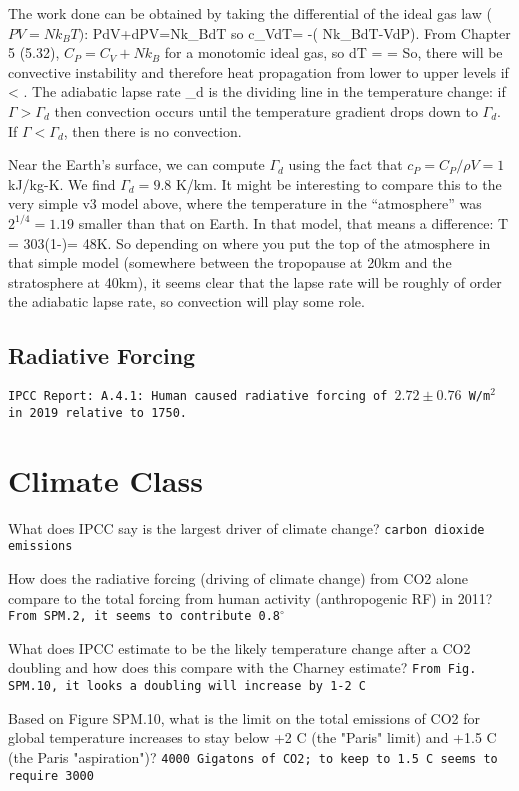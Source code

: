 \documentclass[11pt]{book}
\begin{document}
The work done can be obtained by taking the differential of the ideal gas law ($PV=Nk_BT)$:
\be
PdV+dPV=Nk_BdT\ee
so
\be
c_VdT= -\left( Nk_BdT-VdP\right).
\ee
From Chapter 5 (5.32), $C_P=C_V+Nk_B$ for a monotomic ideal gas, so
\be
dT =  = 
\ee
So, there will be convective instability and therefore heat propagation from lower to upper levels if
\be
{} < \Gamma.
\ee
The adiabatic lapse rate \be
\Gamma_d \equiv {}
\ee
is the dividing line in the temperature change: if $\Gamma>\Gamma_d$ then convection occurs until the temperature gradient drops down to $\Gamma_d$. If $\Gamma< \Gamma_d$, then there is no convection.

Near the Earth's surface, we can compute $\Gamma_d$ using the fact that $c_P=C_P/\rho V=1$ kJ/kg-K. We find $\Gamma_d=9.8$ K/km. It might be interesting to compare this to the very simple v3 model above, where the temperature in the ``atmosphere'' was $2^{1/4}=1.19$ smaller than that on Earth. In that model, that means a difference: 
\be
\Delta T = 303\left(1-\right)= 48K.\ee
So depending on where you put the top of the atmosphere in that simple model (somewhere between the tropopause at 20km and the stratosphere at 40km), it seems clear that the lapse rate will be roughly of order the adiabatic lapse rate, so convection will play some role.

\newcommand\ipcc[1]{{\tt IPCC Report: #1}}

\section{Radiative Forcing}

\ipcc{A.4.1: Human caused radiative forcing of $2.72\pm 0.76$ W/m$^2$ in 2019 relative to 1750.}

\appendix
\newcommand\ans[1]{{\tt #1}}
\chapter{Climate Class}

\bee
\item What does IPCC say is the largest driver of climate change?
\ans{carbon dioxide emissions}
\item How does the radiative forcing (driving of climate change) from CO2 alone compare to the total forcing from human activity (anthropogenic RF) in 2011?
\ans{From SPM.2, it seems to contribute 0.8$^\circ$}
\item What does IPCC estimate to be the likely temperature change after a CO2 doubling and how does this compare with the Charney estimate?
\ans{From Fig. SPM.10, it looks a doubling will increase by 1-2 C}
\item Based on Figure SPM.10, what is the limit on the total emissions of CO2 for global temperature increases to stay below +2 C (the "Paris" limit) and +1.5 C (the Paris "aspiration")?
\ans{4000 Gigatons of CO2; to keep to 1.5 C seems to require 3000}
\eee
\end{document}

